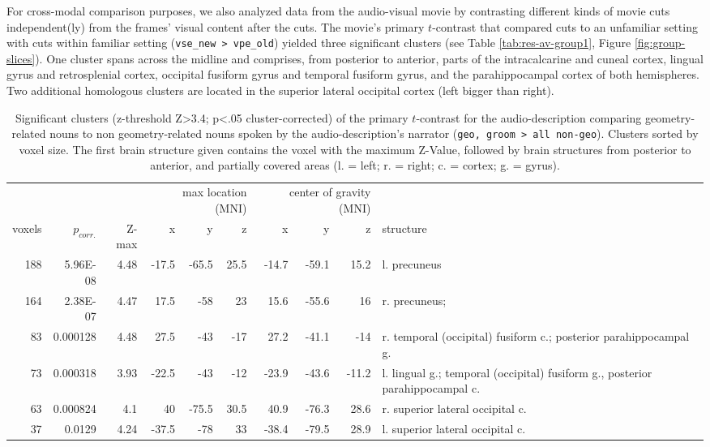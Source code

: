 \documentclass[english]{article}
\begin{document}

For cross-modal comparison purposes, we also analyzed data from the audio-visual
movie by contrasting different kinds of movie cuts independent(ly) from the
frames' visual content after the cuts.
The movie's primary $t$-contrast that compared cuts to an unfamiliar setting
with cuts within familiar setting (\texttt{vse\_new > vpe\_old}) yielded three
significant clusters (see Table \ref{tab:res-av-group1}, Figure
\ref{fig:group-slices}).
One cluster spans across the midline and comprises, from posterior to anterior,
parts of the intracalcarine and cuneal cortex, lingual gyrus and retrosplenial
cortex, occipital fusiform gyrus and temporal fusiform gyrus, and the
parahippocampal cortex of both hemispheres.
Two additional homologous clusters are located in the superior lateral occipital
cortex (left bigger than right).


\begin{table}[t]
    \caption{Significant clusters (z-threshold Z>3.4; p<.05 cluster-corrected)
        of the primary $t$-contrast for the audio-description comparing
        geometry-related nouns to non geometry-related nouns spoken by the
        audio-description's narrator (\texttt{geo, groom > all non-geo}).
        Clusters sorted by voxel size.
    The first brain structure given contains the voxel with the maximum Z-Value,
followed by brain structures from posterior to anterior, and partially covered
areas (l. = left; r. = right; c. = cortex; g. = gyrus).}
    \label{tab:res-ao-group1}
\begin{tabular}{rrrrrrrrrp{3cm}}
\toprule
& & & \multicolumn{3}{r}{max location (MNI)} & \multicolumn{3}{r}{center of gravity (MNI)} &
\\ \cmidrule{4-6} \cmidrule{7-9}
voxels & $p_{corr.}$ & Z-max & x & y & z  & x & y & z & structure \\
\midrule
188 & 5.96E-08 & 4.48 & -17.5 & -65.5 & 25.5 & -14.7 & -59.1 & 15.2 & l. precuneus \\
164 & 2.38E-07 & 4.47 & 17.5 & -58 & 23 & 15.6 & -55.6 & 16 & r. precuneus; \\
83 & 0.000128 & 4.48 & 27.5 & -43 & -17 & 27.2 & -41.1 & -14 & r. temporal (occipital) fusiform c.; posterior parahippocampal g. \\
73 & 0.000318 & 3.93 & -22.5 & -43 & -12 & -23.9 & -43.6 & -11.2 & l. lingual g.; temporal (occipital) fusiform g., posterior parahippocampal c. \\
63 & 0.000824 & 4.1 & 40 & -75.5 & 30.5 & 40.9 & -76.3 & 28.6 & r. superior lateral occipital c. \\
37 & 0.0129 & 4.24 & -37.5 & -78 & 33 & -38.4 & -79.5 & 28.9 & l. superior lateral occipital c. \\
\bottomrule
\end{tabular}
\end{table}
\end{document}
